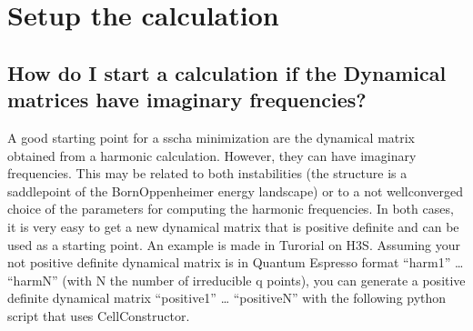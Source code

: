 \documentclass[a4paper,11pt,english]{sphinxmanual}
\begin{document}
\section{Setup the calculation}
\label{\detokenize{faq:setup-the-calculation}}

\subsection{How do I start a calculation if the Dynamical matrices have imaginary frequencies?}
\label{\detokenize{faq:how-do-i-start-a-calculation-if-the-dynamical-matrices-have-imaginary-frequencies}}
\sphinxAtStartPar
A good starting point for a sscha minimization are the dynamical matrix obtained from a harmonic calculation. However, they can have imaginary frequencies. This may be related to both instabilities (the structure is a saddle\sphinxhyphen{}point of the Born\sphinxhyphen{}Oppenheimer energy landscape) or to a not well\sphinxhyphen{}converged choice of the parameters for computing the harmonic frequencies.
In both cases, it is very easy to get a new dynamical matrix that is positive definite and can be used as a starting point. An example is made in Turorial on H3S.
Assuming your not positive definite dynamical matrix is in Quantum Espresso format “harm1” … “harmN” (with N the number of irreducible q points), you can generate a positive definite dynamical matrix “positive1” … “positiveN” with the following python script that uses CellConstructor.

\begin{sphinxVerbatim}[commandchars=\\\{\}]
   
 

     



\end{sphinxVerbatim}
\end{document}
